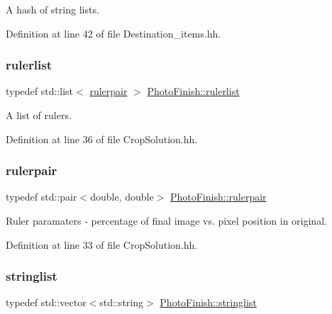 A hash of string lists. 



Definition at line 42 of file Destination\+\_\+items.\+hh.

\mbox{\label{namespace_photo_finish_a0abe5e95cf4de0f8f86aeabcf037082b}} 
\subsubsection{\texorpdfstring{rulerlist}{rulerlist}}
{\footnotesize\ttfamily typedef std\+::list$<$ \hyperlink{namespace_photo_finish_aa05cab28f1c88a992ff7c1e36fbe9a74}{rulerpair} $>$ \hyperlink{namespace_photo_finish_a0abe5e95cf4de0f8f86aeabcf037082b}{Photo\+Finish\+::rulerlist}}



A list of rulers. 



Definition at line 36 of file Crop\+Solution.\+hh.

\mbox{\label{namespace_photo_finish_aa05cab28f1c88a992ff7c1e36fbe9a74}} 
\subsubsection{\texorpdfstring{rulerpair}{rulerpair}}
{\footnotesize\ttfamily typedef std\+::pair$<$double, double$>$ \hyperlink{namespace_photo_finish_aa05cab28f1c88a992ff7c1e36fbe9a74}{Photo\+Finish\+::rulerpair}}



Ruler paramaters -\/ percentage of final image vs. pixel position in original. 



Definition at line 33 of file Crop\+Solution.\+hh.

\mbox{\label{namespace_photo_finish_a5b181b4da2f4f053ba4db6273f62310d}} 
\subsubsection{\texorpdfstring{stringlist}{stringlist}}
{\footnotesize\ttfamily typedef std\+::vector$<$std\+::string$>$ \hyperlink{namespace_photo_finish_a5b181b4da2f4f053ba4db6273f62310d}{Photo\+Finish\+::stringlist}}



